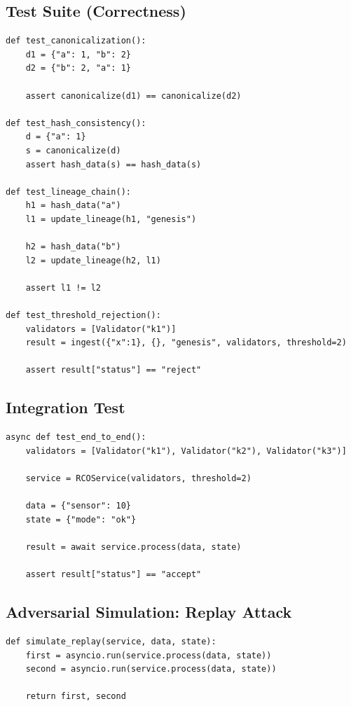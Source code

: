 \subsection{Test Suite (Correctness)}

\begin{verbatim}
def test_canonicalization():
    d1 = {"a": 1, "b": 2}
    d2 = {"b": 2, "a": 1}

    assert canonicalize(d1) == canonicalize(d2)

def test_hash_consistency():
    d = {"a": 1}
    s = canonicalize(d)
    assert hash_data(s) == hash_data(s)

def test_lineage_chain():
    h1 = hash_data("a")
    l1 = update_lineage(h1, "genesis")

    h2 = hash_data("b")
    l2 = update_lineage(h2, l1)

    assert l1 != l2

def test_threshold_rejection():
    validators = [Validator("k1")]
    result = ingest({"x":1}, {}, "genesis", validators, threshold=2)

    assert result["status"] == "reject"
\end{verbatim}

\subsection{Integration Test}

\begin{verbatim}
async def test_end_to_end():
    validators = [Validator("k1"), Validator("k2"), Validator("k3")]

    service = RCOService(validators, threshold=2)

    data = {"sensor": 10}
    state = {"mode": "ok"}

    result = await service.process(data, state)

    assert result["status"] == "accept"
\end{verbatim}

\subsection{Adversarial Simulation: Replay Attack}

\begin{verbatim}
def simulate_replay(service, data, state):
    first = asyncio.run(service.process(data, state))
    second = asyncio.run(service.process(data, state))

    return first, second
\end{verbatim}

